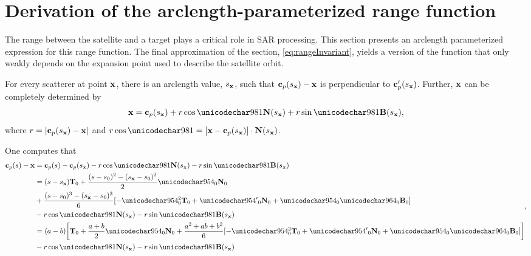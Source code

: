 \section{Derivation of the arclength-parameterized range function}
\label{an:rangeComputation}
The range between the satellite and a target plays a critical role in SAR processing. This section presents an arclength parameterized expression for this range function. The final approximation of the section, \eqref{eq:rangeInvariant}, yields a version of the function that only weakly depends on the expansion point used to describe the satellite orbit.
\par
For every scatterer at point $\mathbf{\mathbf{x}}$, there is an arclength value, $s_{\mathbf{x}}$, such that $\mathbf{c}_p(s_{\mathbf{x}}) - \mathbf{\mathbf{x}}$ is perpendicular to $\mathbf{c}_p'(s_{\mathbf{x}})$. Further, $\mathbf{\mathbf{x}}$ can be completely determined by 
\begin{equation}
 \vct\target = \satp(\targetxparm) + \targetrange\cos\targetdepression\vct{N}(\targetxparm) + \targetrange\sin\targetdepression\vct{B}(\targetxparm),
\end{equation}
where $r=\lvert\mathbf{c}_p(s_{\mathbf{x}})-\mathbf{\mathbf{x}}\rvert$ and $\targetrange\cos\targetdepression = [\vct\target - \satp(\targetxparm)]\cdot\vct{N}(\targetxparm)$.
\par
One computes that
\begin{equation}
\begin{split}
 \satp(\parm)-\vct\target &= \satp(\parm) - \satp(\targetxparm) - \targetrange\cos\targetdepression\vct{N}(\targetxparm) - \targetrange\sin\targetdepression\vct{B}(\targetxparm)\\
 &= (\parm-\targetxparm)\vct{T}_0 + \frac{(\parm-\parm_0)^2 - (\targetxparm - \parm_0)^2}{2}\kappa_0\vct{N}_0\\
 &+\frac{(\parm-\parm_0)^3 - (\targetxparm - \parm_0)^3}{6}[-\kappa^2_0\vct{T}_0 + {\kappa'}_0\vct{N}_0 + \kappa_0\tau_0\vct{B}_0]\\
 &- \targetrange\cos\targetdepression\vct{N}(\targetxparm) - \targetrange\sin\targetdepression\vct{B}(\targetxparm)\\
 &= (a-b)\biggl[\vct{T}_0 + \frac{a+b}{2}\kappa_0\vct{N}_0 +\frac{a^2+ab+b^2}{6}[-\kappa^2_0\vct{T}_0 + {\kappa'}_0\vct{N}_0 + \kappa_0\tau_0\vct{B}_0]\biggr]\\
 &- \targetrange\cos\targetdepression\vct{N}(\targetxparm) - \targetrange\sin\targetdepression\vct{B}(\targetxparm)
 \end{split},
\end{equation}
